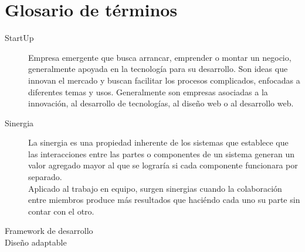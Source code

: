 \chapter{Glosario de términos}

\begin{description}
    \item[StartUp] Empresa emergente que busca arrancar, emprender o montar un negocio, generalmente apoyada en la tecnología para su desarrollo. Son ideas que innovan el mercado y buscan facilitar los procesos complicados, enfocadas a diferentes temas y usos. Generalmente son empresas asociadas a la innovación, al desarrollo de tecnologías, al diseño web o al desarrollo web.
    \item[Sinergia] La sinergia es una propiedad inherente de los sistemas que establece que las interacciones entre las partes o componentes de un sistema generan un valor agregado mayor al que se lograría si cada componente funcionara por separado.\\ Aplicado al trabajo en equipo, surgen sinergias cuando la colaboración entre miembros produce más resultados que haciéndo cada uno su parte sin contar con el otro.
    \item[Framework de desarrollo]
    \item[Diseño adaptable]
\end{description}























